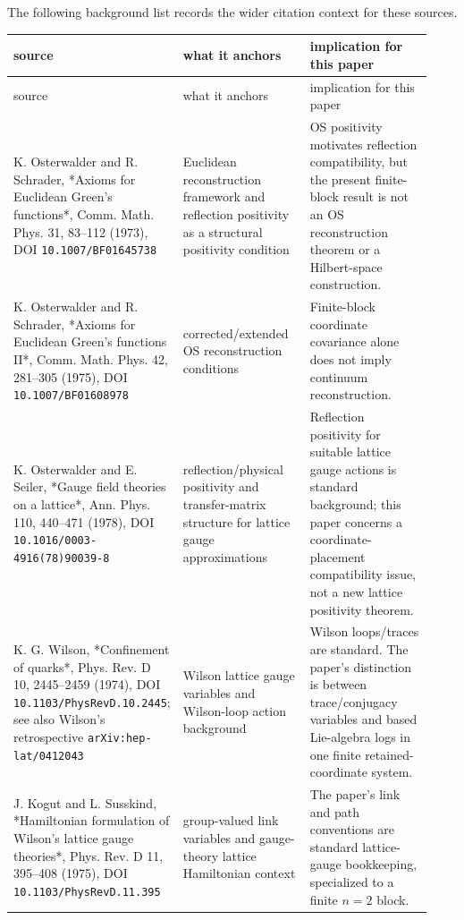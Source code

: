 \documentclass[10pt]{article}
\begin{document}
The following background list records the wider citation context for these sources.

\begin{center}
\small
\begin{longtable}{|p{0.31\linewidth}|p{0.31\linewidth}|p{0.31\linewidth}|}
\hline
source & what it anchors & implication for this paper \\
\hline
\endfirsthead
\hline
source & what it anchors & implication for this paper \\
\hline
\endhead
K. Osterwalder and R. Schrader, *Axioms for Euclidean Green's functions*, Comm. Math. Phys. 31, 83--112 (1973), DOI \texttt{10.1007/BF01645738} & Euclidean reconstruction framework and reflection positivity as a structural positivity condition & OS positivity motivates reflection compatibility, but the present finite-block result is not an OS reconstruction theorem or a Hilbert-space construction. \\
\hline
K. Osterwalder and R. Schrader, *Axioms for Euclidean Green's functions II*, Comm. Math. Phys. 42, 281--305 (1975), DOI \texttt{10.1007/BF01608978} & corrected/extended OS reconstruction conditions & Finite-block coordinate covariance alone does not imply continuum reconstruction. \\
\hline
K. Osterwalder and E. Seiler, *Gauge field theories on a lattice*, Ann. Phys. 110, 440--471 (1978), DOI \texttt{10.1016/0003-4916(78)90039-8} & reflection/physical positivity and transfer-matrix structure for lattice gauge approximations & Reflection positivity for suitable lattice gauge actions is standard background; this paper concerns a coordinate-placement compatibility issue, not a new lattice positivity theorem. \\
\hline
K. G. Wilson, *Confinement of quarks*, Phys. Rev. D 10, 2445--2459 (1974), DOI \texttt{10.1103/PhysRevD.10.2445}; see also Wilson's retrospective \texttt{arXiv:hep-lat/0412043} & Wilson lattice gauge variables and Wilson-loop action background & Wilson loops/traces are standard.  The paper's distinction is between trace/conjugacy variables and based Lie-algebra logs in one finite retained-coordinate system. \\
\hline
J. Kogut and L. Susskind, *Hamiltonian formulation of Wilson's lattice gauge theories*, Phys. Rev. D 11, 395--408 (1975), DOI \texttt{10.1103/PhysRevD.11.395} & group-valued link variables and gauge-theory lattice Hamiltonian context & The paper's link and path conventions are standard lattice-gauge bookkeeping, specialized to a finite \(n=2\) block. \\

\end{longtable}
\end{center}
\end{document}
